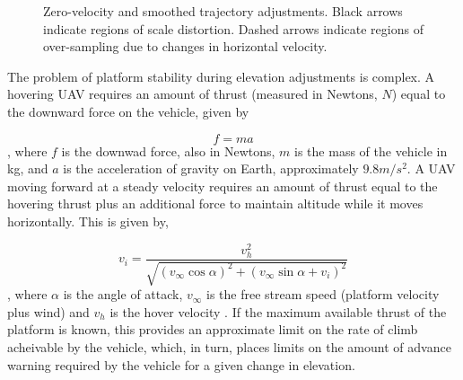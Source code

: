 \documentclass[10pt,a4paper]{report}
\begin{document}
\begin{figure}
\centering
\def\svgscale{0.5}

\caption{Zero-velocity and smoothed trajectory adjustments. Black arrows indicate regions of scale distortion. Dashed arrows indicate regions of over-sampling due to changes in horizontal velocity.}
\label{fig:uav_smooth_traj}
\end{figure}

The problem of platform stability during elevation adjustments is complex. A hovering UAV requires an amount of thrust (measured in Newtons, $N$) equal to the downward force on the vehicle, given by

\begin{equation}
f = ma
\label{eq:hover_force}
\end{equation}, where $f$ is the downwad force, also in Newtons, $m$ is the mass of the vehicle in kg, and $a$ is the acceleration of gravity on Earth, approximately $9.8m/s^2$. A UAV moving forward at a steady velocity requires an amount of thrust equal to the hovering thrust plus an additional force to maintain altitude while it moves horizontally. This is given by,

\begin{equation}
v_i = \dfrac{ v_h^2 } { \sqrt{ (v_\infty \cos \alpha)^2 + (v_\infty \sin \alpha + v_i)^2 } } 
\label{eq:move_force}
\end{equation}, where $\alpha$ is the angle of attack, $v_\infty$ is the free stream speed (platform velocity plus wind) and $v_h$ is the hover velocity \cite{Hoffmann2007}. If the maximum available thrust of the platform is known, this provides an approximate limit on the rate of climb acheivable by the vehicle, which, in turn, places limits on the amount of advance warning required by the vehicle for a given change in elevation.

\iffalse
As an example, for a UAV weighing $10\si{\kg}$ flying at $5\si{\m\per\s}$, the distance required to climb $1\si{\m}$ is,

\begin{equation}
v_i = \dfrac{ v_h^2 } { \sqrt{ (v_\infty \cos \alpha)^2 + (v_\infty \sin \alpha + v_i)^2 } } 
\label{eq:move_exple}
\end{equation}.
\fi
\end{document}
